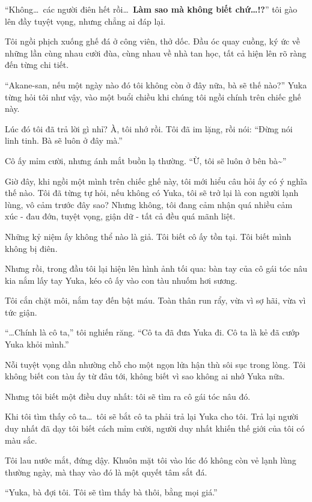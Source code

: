 \documentclass[../main.tex]{subfiles}
\begin{document}
``Không\dots\ các người điên hết rồi\dots\ \textbf{Làm sao mà không biết chứ\dots!?}'' tôi gào lên đầy tuyệt vọng, nhưng chẳng ai đáp lại.

Tôi ngồi phịch xuống ghế đá ở công viên, thở dốc. Đầu óc quay cuồng, ký ức về những lần cùng nhau cười đùa, cùng nhau về nhà tan học, tất cả hiện lên rõ ràng đến từng chi tiết.

``Akane-san, nếu một ngày nào đó tôi không còn ở đây nữa, bà sẽ thế nào?'' Yuka từng hỏi tôi như vậy, vào một buổi chiều khi chúng tôi ngồi chính trên chiếc ghế này.

Lúc đó tôi đã trả lời gì nhỉ? À, tôi nhớ rồi. Tôi đã im lặng, rồi nói: ``Đừng nói linh tinh. Bà sẽ luôn ở đây mà.''

Cô ấy mỉm cười, nhưng ánh mắt buồn lạ thường. ``Ừ, tôi sẽ luôn ở bên bà\~{}''

Giờ đây, khi ngồi một mình trên chiếc ghế này, tôi mới hiểu câu hỏi ấy có ý nghĩa thế nào. Tôi đã từng tự hỏi, nếu không có Yuka, tôi sẽ trở lại là con người lạnh lùng, vô cảm trước đây sao? Nhưng không, tôi đang cảm nhận quá nhiều cảm xúc - đau đớn, tuyệt vọng, giận dữ - tất cả đều quá mãnh liệt.

Những kỷ niệm ấy không thể nào là giả. Tôi biết cô ấy tồn tại. Tôi biết mình không bị điên.

Nhưng rồi, trong đầu tôi lại hiện lên hình ảnh tối qua: bàn tay của cô gái tóc nâu kia nắm lấy tay Yuka, kéo cô ấy vào con tàu nhuốm hơi sương.

Tôi cắn chặt môi, nắm tay đến bật máu. Toàn thân run rẩy, vừa vì sợ hãi, vừa vì tức giận.

``\dots Chính là cô ta,'' tôi nghiến răng. ``Cô ta đã đưa Yuka đi. Cô ta là kẻ đã cướp Yuka khỏi mình.''

Nỗi tuyệt vọng dần nhường chỗ cho một ngọn lửa hận thù sôi sục trong lòng. Tôi không biết con tàu ấy từ đâu tới, không biết vì sao không ai nhớ Yuka nữa.

Nhưng tôi biết một điều duy nhất: tôi sẽ tìm ra cô gái tóc nâu đó.

Khi tôi tìm thấy cô ta\dots\ tôi sẽ bắt cô ta phải trả lại Yuka cho tôi. Trả lại người duy nhất đã dạy tôi biết cách mỉm cười, người duy nhất khiến thế giới của tôi có màu sắc.

Tôi lau nước mắt, đứng dậy. Khuôn mặt tôi vào lúc đó không còn vẻ lạnh lùng thường ngày, mà thay vào đó là một quyết tâm sắt đá.

``Yuka, bà đợi tôi. Tôi sẽ tìm thấy bà thôi, bằng mọi giá.''
\end{document}

